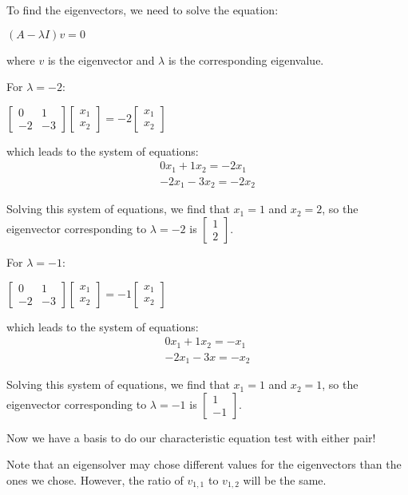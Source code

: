 \documentclass[a4paper]{article}
\begin{document}
To find the eigenvectors, we need to solve the equation:

$(A - \lambda I)v = 0$

where $v$ is the eigenvector and $\lambda$ is the corresponding eigenvalue.

For $\lambda = -2$:

$\begin{bmatrix} 0 & 1 \\ -2 & -3 \end{bmatrix} \begin{bmatrix} x_1 \\ x_2 \end{bmatrix} = -2 \begin{bmatrix} x_1 \\ x_2 \end{bmatrix}$

which leads to the system of equations:
\begin{align*}
0x_1 + 1x_2 = -2x_1 \\  
-2x_1 - 3x_2 = -2x_2 
\end{align*}

Solving this system of equations, we find that $x_1 = 1$ and $x_2 = 2$, so the
eigenvector corresponding to $\lambda = -2$ is $\begin{bmatrix} 1 \\ 2 \end{bmatrix}$.

For $\lambda = -1$:

$\begin{bmatrix} 0 & 1 \\ -2 & -3 \end{bmatrix} \begin{bmatrix} x_1 \\ x_2 \end{bmatrix} = -1 \begin{bmatrix} x_1 \\ x_2 \end{bmatrix}$

which leads to the system of equations: 
\begin{align*}
    0x_1 + 1x_2 = -x_1 \\
    -2x_1 - 3x = -x_2
\end{align*}

Solving this system of equations, we find that $x_1 = 1$ and $x_2 = 1$, so the
eigenvector corresponding to $\lambda = -1$ is $\begin{bmatrix} 1 \\ -1 \end{bmatrix}$.

Now we have a basis to do our characteristic equation test with either pair!

Note that an eigensolver may chose different values for the eigenvectors than the
ones we chose. However, the ratio of $v_{1,1}$ to $v_{1,2}$ will be the same.  



 
\end{document}
